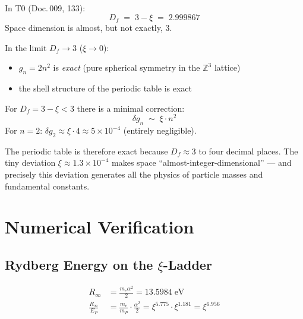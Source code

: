 In T0 (Doc.\,009, 133):
\begin{equation}
  D_f \;=\; 3 - \xi \;=\; 2.999867
\end{equation}
Space dimension is almost, but not exactly, 3.

In the limit $D_f \to 3$ ($\xi \to 0$):
\begin{itemize}
  \item $g_n = 2n^2$ is \emph{exact} (pure spherical symmetry in the $\mathbb{Z}^3$ lattice)
  \item the shell structure of the periodic table is exact
\end{itemize}

For $D_f = 3 - \xi < 3$ there is a minimal correction:
\begin{equation}
  \delta g_n \;\sim\; \xi \cdot n^2
\end{equation}
For $n = 2$: $\delta g_2 \approx \xi \cdot 4 \approx 5 \times 10^{-4}$
(entirely negligible).

The periodic table is therefore exact because $D_f \approx 3$ to four decimal
places. The tiny deviation $\xi \approx 1.3 \times 10^{-4}$ makes space
``almost-integer-dimensional'' — and precisely this deviation generates all
the physics of particle masses and fundamental constants.

\section{Numerical Verification}
\label{sec:numerics}

\subsection{Rydberg Energy on the \texorpdfstring{$\xi$}{xi}-Ladder}

\begin{align}
  R_\infty &= \frac{m_e \alpha^2}{2} = 13.5984\;\text{eV} \\
  \frac{R_\infty}{E_P} &= \frac{m_e}{m_P} \cdot \frac{\alpha^2}{2}
    = \xi^{5.775} \cdot \xi^{1.181} = \xi^{6.956}
\end{align}

\begin{table}[htbp]
\centering
\caption{Rydberg energy: T0 derivation vs. measurement}
\label{tab:rydberg}
\end{table}

